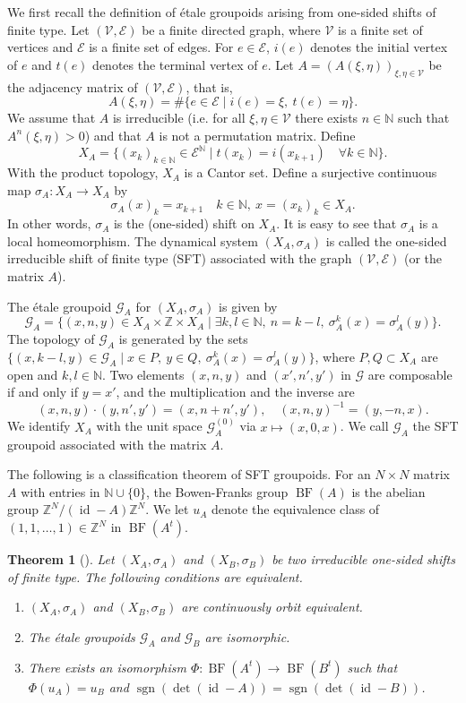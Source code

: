 \documentclass[11pt]{article}
\newtheorem{theorem}{Theorem}[section]
\theoremstyle{definition}
\numberwithin{equation}{section}
\newcommand{\BF}{\operatorname{BF}}
\newcommand{\id}{\operatorname{id}}
\newcommand{\sgn}{\operatorname{sgn}}
\newcommand{\G}{\mathcal{G}}
\newcommand{\N}{\mathbb{N}}
\newcommand{\Z}{\mathbb{Z}}
\begin{document}
We first recall the definition of 
\'etale groupoids arising from one-sided shifts of finite type. 
Let $(\mathcal{V},\mathcal{E})$ be a finite directed graph, 
where $\mathcal{V}$ is a finite set of vertices 
and $\mathcal{E}$ is a finite set of edges. 
For $e\in\mathcal{E}$, $i(e)$ denotes the initial vertex of $e$ and 
$t(e)$ denotes the terminal vertex of $e$. 
Let $A=(A(\xi,\eta))_{\xi,\eta\in\mathcal{V}}$ be 
the adjacency matrix of $(\mathcal{V},\mathcal{E})$, 
that is, 
\[
A(\xi,\eta)=\#\{e\in\mathcal{E}\mid i(e)=\xi,\ t(e)=\eta\}. 
\]
We assume that $A$ is irreducible 
(i.e. for all $\xi,\eta\in\mathcal{V}$ 
there exists $n\in\N$ such that $A^n(\xi,\eta)>0$) 
and that $A$ is not a permutation matrix. 
Define 
\[
X_A=\{(x_k)_{k\in\N}\in\mathcal{E}^\N
\mid t(x_k)=i(x_{k+1})\quad\forall k\in\N\}. 
\]
With the product topology, $X_A$ is a Cantor set. 
Define a surjective continuous map $\sigma_A:X_A\to X_A$ by 
\[
\sigma_A(x)_k=x_{k+1}\quad k\in\N,\ x=(x_k)_k\in X_A. 
\]
In other words, $\sigma_A$ is the (one-sided) shift on $X_A$.  
It is easy to see that $\sigma_A$ is a local homeomorphism. 
The dynamical system $(X_A,\sigma_A)$ is called 
the one-sided irreducible shift of finite type (SFT) 
associated with the graph $(\mathcal{V},\mathcal{E})$ (or the matrix $A$). 

The \'etale groupoid $\G_A$ for $(X_A,\sigma_A)$ is given by 
\[
\G_A=\{(x,n,y)\in X_A\times\Z\times X_A\mid
\exists k,l\in\N,\ n=k{-}l,\ \sigma_A^k(x)=\sigma_A^l(y)\}. 
\]
The topology of $\G_A$ is generated by the sets 
$\{(x,k{-}l,y)\in\G_A\mid x\in P,\ y\in Q,\ \sigma_A^k(x)=\sigma_A^l(y)\}$, 
where $P,Q\subset X_A$ are open and $k,l\in\N$. 
Two elements $(x,n,y)$ and $(x',n',y')$ in $\G$ are composable 
if and only if $y=x'$, and the multiplication and the inverse are 
\[
(x,n,y)\cdot(y,n',y')=(x,n{+}n',y'),\quad (x,n,y)^{-1}=(y,-n,x). 
\]
We identify $X_A$ with the unit space $\G_A^{(0)}$ via $x\mapsto(x,0,x)$. 
We call $\G_A$ the SFT groupoid associated with the matrix $A$. 

The following is a classification theorem of SFT groupoids. 
For an $N\times N$ matrix $A$ with entries in $\N\cup\{0\}$, 
the Bowen-Franks group $\BF(A)$ is the abelian group $\Z^N/(\id-A)\Z^N$. 
We let $u_A$ denote 
the equivalence class of $(1,1,\dots,1)\in\Z^N$ in $\BF(A^t)$. 

\begin{theorem}[{\cite[Theorem 3.6]{MM14Kyoto}}]\label{SFTclassify}
Let $(X_A,\sigma_A)$ and $(X_B,\sigma_B)$ be 
two irreducible one-sided shifts of finite type. 
The following conditions are equivalent. 
\begin{enumerate}
\item $(X_A,\sigma_A)$ and $(X_B,\sigma_B)$ are 
continuously orbit equivalent. 
\item The \'etale groupoids $\G_A$ and $\G_B$ are isomorphic. 
\item There exists an isomorphism $\Phi:\BF(A^t)\to\BF(B^t)$ 
such that $\Phi(u_A)=u_B$ and $\sgn(\det(\id-A))=\sgn(\det(\id-B))$. 
\end{enumerate}
\end{theorem}
\end{document}
